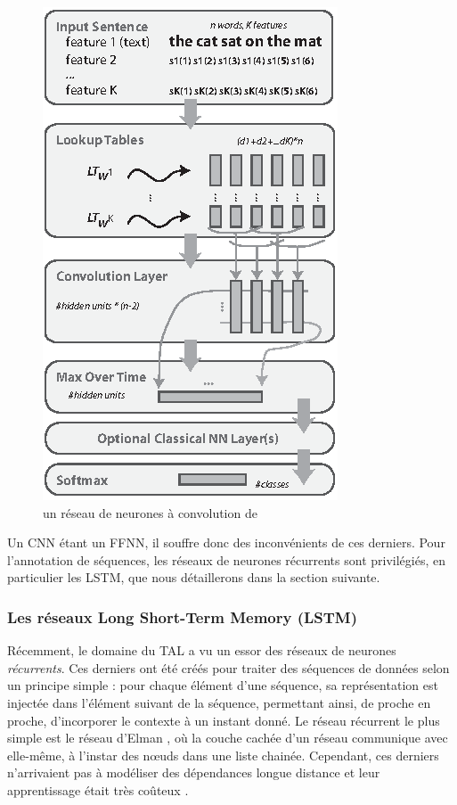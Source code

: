 \documentclass[12pt,a4paper,times,twoside,openright]{report}
\begin{document}
\begin{figure}[ht!]
\centering
\includegraphics[scale=1.25]{images/general/collobert2008}
\caption{un réseau de neurones à convolution de \citet{collobert2008unified}}
\label{fig:CNN-collobert2008}
\end{figure}

Un CNN étant un FFNN, il souffre donc des inconvénients de ces derniers. Pour l'annotation de séquences, les réseaux de neurones récurrents sont privilégiés, en particulier les LSTM, que nous détaillerons dans la section suivante.


            
            \subsubsection{Les réseaux Long Short-Term Memory (LSTM)}
            \label{subsubsec:LSTMs}
Récemment, le domaine du TAL a vu un essor des réseaux de neurones \emph{récurrents}. Ces derniers ont été créés pour traiter des séquences de données selon un principe simple : pour chaque élément d'une séquence, sa représentation est injectée dans l'élément suivant de la séquence, permettant ainsi, de proche en proche, d'incorporer le contexte à un instant donné. Le réseau récurrent le plus simple est le réseau d'Elman \citep{elman1990finding}, où la couche cachée d'un réseau communique avec elle-même, à l'instar des n\oe uds dans une liste chainée. Cependant, ces derniers n'arrivaient pas à modéliser des dépendances longue distance et leur apprentissage était très coûteux \citep{bengio1994learning}.
\end{document}
